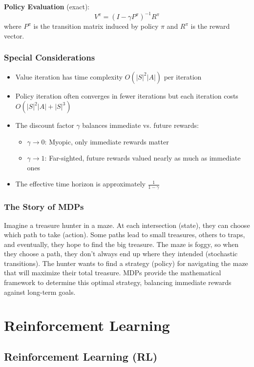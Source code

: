 \documentclass{article}
\begin{document}
\textbf{Policy Evaluation} (exact):
\begin{equation}
    V^\pi = (I - \gamma P^\pi)^{-1} R^\pi
\end{equation}
where $P^\pi$ is the transition matrix induced by policy $\pi$ and $R^\pi$ is the reward vector.

\subsubsection{Special Considerations}
\begin{itemize}
    \item Value iteration has time complexity $O(|S|^2|A|)$ per iteration
    \item Policy iteration often converges in fewer iterations but each iteration costs $O(|S|^2|A| + |S|^3)$
    \item The discount factor $\gamma$ balances immediate vs. future rewards:
    \begin{itemize}
        \item $\gamma \to 0$: Myopic, only immediate rewards matter
        \item $\gamma \to 1$: Far-sighted, future rewards valued nearly as much as immediate ones
    \end{itemize}
    \item The effective time horizon is approximately $\frac{1}{1-\gamma}$
\end{itemize}

\subsubsection{The Story of MDPs}
Imagine a treasure hunter in a maze. At each intersection (state), they can choose which path to take (action). Some paths lead to small treasures, others to traps, and eventually, they hope to find the big treasure. The maze is foggy, so when they choose a path, they don't always end up where they intended (stochastic transitions). The hunter wants to find a strategy (policy) for navigating the maze that will maximize their total treasure. MDPs provide the mathematical framework to determine this optimal strategy, balancing immediate rewards against long-term goals.

\section{Reinforcement Learning}

\subsection{Reinforcement Learning (RL)}
\end{document}
